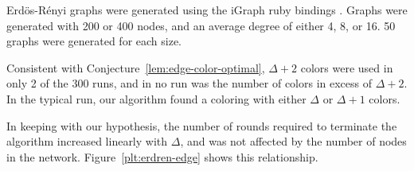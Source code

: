 Erd\"{o}s-R\'{e}nyi graphs were generated using the iGraph ruby bindings \cite{Gutteridge:2007fk}. Graphs were generated with 200 or 400 nodes, and an average degree of either 4, 8, or 16. 50 graphs were generated for each size.

Consistent with Conjecture~\ref{lem:edge-color-optimal}, $\Delta + 2$ colors were used in only 2 of the 300 runs, and in no run was the number of colors in excess of $\Delta+2$. In the typical run, our algorithm found a coloring with either $\Delta$ or $\Delta + 1$ colors. 

In keeping with our hypothesis, the number of rounds required to terminate the algorithm increased linearly with $\Delta$, and was not affected by the number of nodes in the network. Figure~\ref{plt:erdren-edge} shows this relationship.


